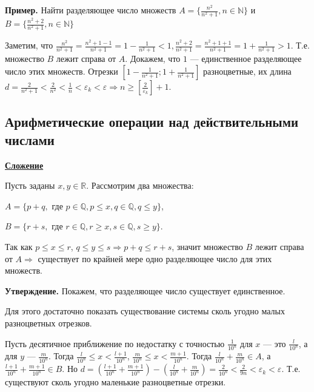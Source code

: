 \documentclass{article}
\begin{document}
        \textbf{Пример.} Найти разделяющее число множеств $A = \{ \frac{n^2}{n^2 + 1}, n \in \mathbb{N} \}$ и $B = \{ \frac{n^2 + 2}{n^2 + 1}, n \in \mathbb{N} \}$

        Заметим, что $\frac{n^2}{n^2 + 1} = \frac{n^2 + 1 - 1}{n^2 + 1} = 1 - \frac{1}{n^2 + 1} < 1, \frac{n^2 + 2}{n^2 + 1} = \frac{n^2 + 1 + 1}{n^2 + 1} = 1 + \frac{1}{n^2 + 1} > 1$. Т.е. множество $B$ лежит справа от $A$. Докажем, что $1$ --- единственное разделяющее число этих множеств. Отрезки $[1 - \frac{1}{n^2 + 1}; 1 + \frac{1}{n^2 + 1}]$ разноцветные, их длина $d = \frac{2}{n^2 + 1} < \frac{2}{n^2} < \frac{1}{n} < \varepsilon_k < \varepsilon \Rightarrow n \geq [\frac{2}{\varepsilon_k}] + 1$.

        \subsection{Арифметические операции над действительными числами}

        \textbf{\underline{Сложение}}
        
        Пусть заданы $x, y \in \mathbb{R}$. Рассмотрим два множества:

        $A = \{p + q, \textrm{ где } p \in \mathbb{Q}, p \leq x, q \in \mathbb{Q}, q \leq y\}$, 

        $B = \{r + s, \textrm{ где } r \in \mathbb{Q}, r \geq x, s \in \mathbb{Q}, s \geq y\}$.

        Так как $p \leq x \leq r$, $q \leq y \leq s \Rightarrow p + q \leq r + s$, значит множество $B$ лежит справа от $A \Rightarrow$ существует по крайней мере одно разделяющее число для этих множеств. 

        \textbf{Утверждение.} Покажем, что разделяющее число существует единственное.

        Для этого достаточно показать существование системы сколь угодно малых разноцветных отрезков. 

        Пусть десятичное приближение по недостатку с точностью $\frac{1}{10^n}$ для $x$ --- это $\frac{l}{10^n}$, а для $y$ --- $\frac{m}{10^n}$. Тогда $\frac{l}{10^n} \leq x < \frac{l + 1}{10^n}$, $\frac{m}{10^n} \leq x < \frac{m + 1}{10^n}$. Тогда $\frac{l}{10^n} + \frac{m}{10^n} \in A$, а $\frac{l + 1}{10^n} + \frac{m + 1}{10^n} \in B$. Но $d = (\frac{l + 1}{10^n} + \frac{m + 1}{10^n}) - (\frac{l}{10^n} + \frac{m}{10^n}) = \frac{2}{10^n} < \frac{2}{9n} < \varepsilon_k < \varepsilon$. Т.е. существуют сколь угодно маленькие разноцветные отрезки. 
\end{document}
